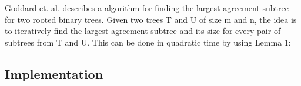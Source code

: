 \chapter{}
Goddard et. al.\cite{nsquared} describes a  algorithm for finding the largest agreement subtree for two rooted binary trees. Given two trees T and U of size m and n, the idea is to iteratively find the largest agreement subtree and its size for every pair of subtrees from T and U. This can be done in quadratic time by using Lemma 1: \todo{\dots}

\section{Implementation}



\todo{\dots}